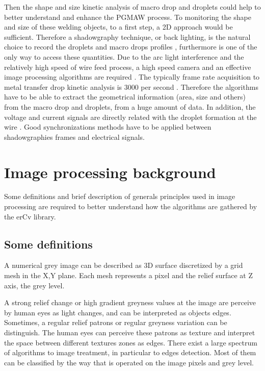 Then the shape and size kinetic analysis of macro drop and 
droplets could help to better understand and enhance the PGMAW 
process. To monitoring the shape and size of these welding 
objects, to a first step, a 2D approach would be sufficient.
 Therefore a shadowgraphy technique, or back lighting, is 
the natural choice to record the droplets and macro drops 
profiles \cite{BALSAMO}, furthermore is one of the only way
 to access these quantities. Due to the arc light interference
 and the relatively high speed of wire feed process, a high
 speed camera and an effective image processing algorithms 
are required \cite{WANG}. The typically frame rate acquisition
 to metal transfer drop kinetic analysis is $3000$ per second 
\cite{WANG}. Therefore the algorithms have to be able to extract
 the geometrical information (area, size and others) from 
the macro drop and droplets, from a huge amount of data. 
In addition, the voltage and current signals are directly
 related with the droplet formation at the wire \cite{BALSAMO}.
 Good synchronizations methods have to be applied between 
shadowgraphies frames and electrical signals.



\section{Image processing background}
\label{image_processing_background}

Some definitions and brief description of generals principles used in image 
processing are required to better understand how the algorithms are gathered by the erCv library.

\subsection{Some definitions}
\label{some_definitions}

A numerical grey image can be described as 3D surface discretized by a grid 
mesh in the X,Y plane. Each mesh represents a pixel and the relief surface
 at Z axis, the grey level.  

A strong relief change or high gradient greyness values at the image are
 perceive by human eyes as light changes, and can be interpreted as 
objects edges. 
Sometimes, a regular relief patrons or regular greyness variation 
can be distinguish. The human eyes can perceive these patrons as 
texture and interpret the space between different textures zones as edges.
There exist a large spectrum of algorithms to image treatment, 
in particular to edges detection. Most of them can be classified 
by the way that is operated on the image pixels and grey level.


